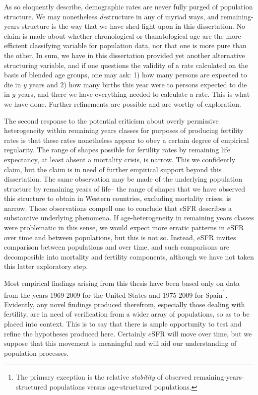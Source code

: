 As \citet{stolnitz1949recent} so eloquently describe, demographic rates are
never fully purged of population structure. We may nonetheless \textit{de}structure in
any of myriad ways, and remaining-years structure is the way that we have shed
light upon in this dissertation. No claim is made about whether chronological or
thanatological age are the more efficient classifying variable for population
data, nor that one is more pure than the other. In sum, we have in this
dissertation provided yet another alternative structuring variable, and if one
questions the validity of a rate calculated on the basis of blended age groups,
one may ask: 1) how many persons are expected to die in $y$ years and 2) how
many births this year were to persons expected to die in $y$ years, and there we
have everything needed to calculate a rate. This is what we have done. Further
refinements are possible and are worthy of exploration.

The second response to the potential criticism about overly permissive
heterogeneity within remaining years classes for purposes of producing
fertility rates is that these rates nonetheless appear to obey a
certain degree of empirical regularity. The range of shapes possible for
fertility rates by remaining life expectancy, at least absent a mortality
crisis, is narrow. This we confidently claim, but the claim is in need of
further empirical support beyond this dissertation. The same observation may be made of
the underlying population structure by remaining years of life-- the range of 
shapes that we have observed this structure to obtain in Western countries, 
excluding mortality crises, is
narrow. These observations compell one to conclude that $e$SFR describes
a substantive underlying phenomena. If age-heterogeneity in remaining years
classes were problematic in this sense, we would expect more erratic patterns in
$e$SFR over time and between populations, but this is not so. Instead, $e$SFR
invites comparison between populations and over time, and such comparisons are
decomposible into mortality and fertility components, although we have not
taken this latter exploratory step. 

Most empirical findings arising from this thesis have been based only on data
from the years 1969-2009 for the United States and 1975-2009 for
Spain\footnote{The primary exception is the relative \textit{stability} of
observed remaining-years-structured populations versus age-structured
populations.}. Evidently, any novel findings produced therefrom, especially
those dealing with fertility, are in need of verification from a wider array of
populations, so as to be placed into context. This is to say that there is ample opportunity to test
and refine the hypotheses produced here. Certainly $e$SFR will move over time,
but we suppose that this movement is meaningful and will aid our understanding
of population processes.

